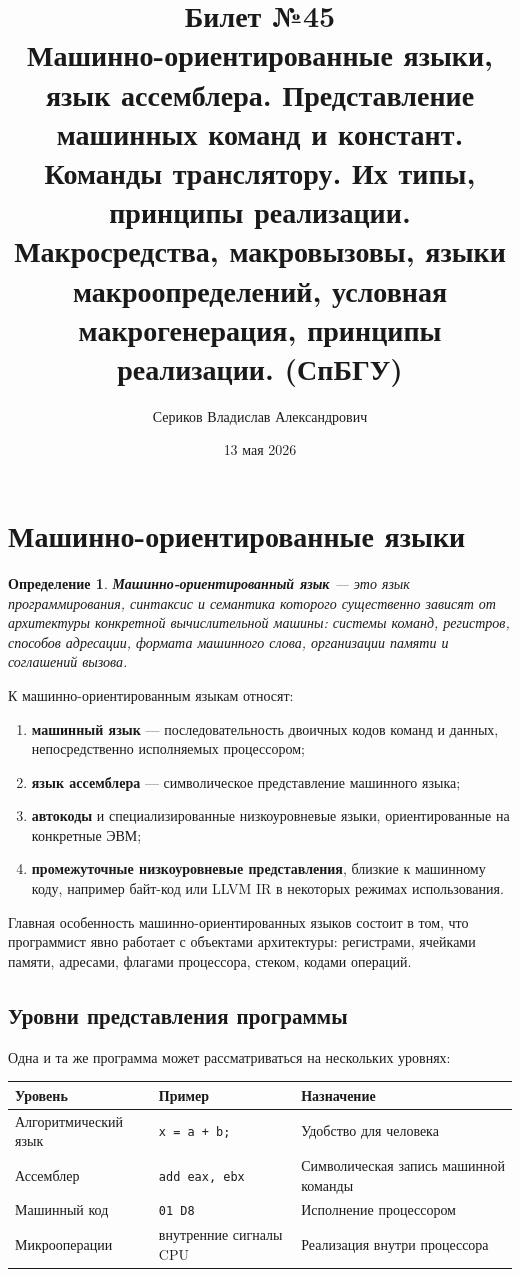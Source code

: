 \documentclass[12pt,a4paper]{article}
\title{Билет №45 \\ \small Машинно-ориентированные языки, язык ассемблера. Представление машинных команд и констант. Команды транслятору. Их типы, принципы реализации. Макросредства, макровызовы, языки макроопределений, условная макрогенерация, принципы реализации. (СпБГУ)}
\author{Сериков Владислав Александрович}
\date{13 мая 2026}
\newtheorem{definition}{Определение}
\begin{document}
\maketitle
\tableofcontents
\newpage

\section{Машинно-ориентированные языки}

\begin{definition}
\textbf{Машинно-ориентированный язык} --- это язык программирования, синтаксис и семантика которого существенно зависят от архитектуры конкретной вычислительной машины: системы команд, регистров, способов адресации, формата машинного слова, организации памяти и соглашений вызова.
\end{definition}

К машинно-ориентированным языкам относят:

\begin{enumerate}
    \item \textbf{машинный язык} --- последовательность двоичных кодов команд и данных, непосредственно исполняемых процессором;
    \item \textbf{язык ассемблера} --- символическое представление машинного языка;
    \item \textbf{автокоды} и специализированные низкоуровневые языки, ориентированные на конкретные ЭВМ;
    \item \textbf{промежуточные низкоуровневые представления}, близкие к машинному коду, например байт-код или LLVM IR в некоторых режимах использования.
\end{enumerate}

Главная особенность машинно-ориентированных языков состоит в том, что программист явно работает с объектами архитектуры: регистрами, ячейками памяти, адресами, флагами процессора, стеком, кодами операций.

\subsection{Уровни представления программы}

Одна и та же программа может рассматриваться на нескольких уровнях:

\begin{center}
\begin{tabular}{lll}
\toprule
Уровень & Пример & Назначение \\
\midrule
Алгоритмический язык & \texttt{x = a + b;} & Удобство для человека \\
Ассемблер & \texttt{add eax, ebx} & Символическая запись машинной команды \\
Машинный код & \texttt{01 D8} & Исполнение процессором \\
Микрооперации & внутренние сигналы CPU & Реализация внутри процессора \\
\bottomrule
\end{tabular}
\end{center}
\end{document}

